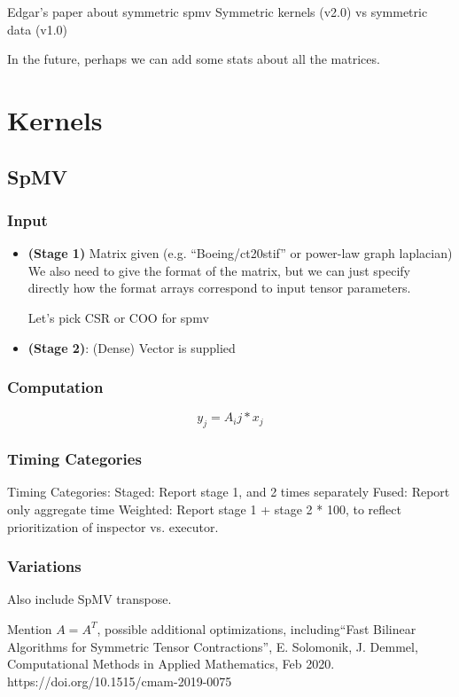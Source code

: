 \documentclass{article}
\begin{document}
Edgar's paper about symmetric spmv
Symmetric kernels (v2.0) vs symmetric data (v1.0)

In the future, perhaps we can add some stats about all the matrices.

\section{Kernels}

\subsection{SpMV}

\subsubsection{Input}
\begin{itemize}
\item \textbf{(Stage 1)}
		Matrix given (e.g. “Boeing/ct20stif” or power-law graph laplacian)
		We also need to give the format of the matrix, but we can just specify directly how the format arrays correspond to input tensor parameters.

		Let’s pick CSR or COO for spmv
\item \textbf{(Stage 2)}:
		(Dense) Vector is supplied
\end{itemize}
\subsubsection{Computation}
$$y_j = A_ij * x_j$$
\subsubsection{Timing Categories}

	Timing Categories:
Staged: Report stage 1, and 2 times separately
Fused: Report only aggregate time
Weighted: Report stage 1 + stage 2 * 100, to reflect prioritization of inspector vs. executor.
\subsubsection{Variations}
    Also include SpMV transpose.

    Mention $A=A^T$, possible additional optimizations,
    including``Fast Bilinear Algorithms for Symmetric Tensor 
    Contractions'', E. Solomonik, J. Demmel, Computational Methods
    in Applied Mathematics, Feb 2020.
    \newline
    https://doi.org/10.1515/cmam-2019-0075
\end{document}

